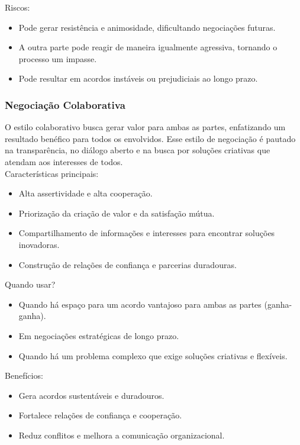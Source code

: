 \documentclass[article,12pt,oneside,a4paper]{article}
\begin{document}
Riscos:

\begin{itemize}
\item Pode gerar resistência e animosidade, dificultando negociações futuras.
\item A outra parte pode reagir de maneira igualmente agressiva, tornando o processo um impasse.
\item Pode resultar em acordos instáveis ou prejudiciais ao longo prazo.
\end{itemize}
\subsubsection{Negociação Colaborativa}
\label{sec:orgda140d4}

O estilo colaborativo busca gerar valor para ambas as partes, enfatizando um resultado benéfico para todos os envolvidos. Esse estilo de negociação é pautado na transparência, no diálogo aberto e na busca por soluções criativas que atendam aos interesses de todos. \\

Características principais:

\begin{itemize}
\item Alta assertividade e alta cooperação.
\item Priorização da criação de valor e da satisfação mútua.
\item Compartilhamento de informações e interesses para encontrar soluções inovadoras.
\item Construção de relações de confiança e parcerias duradouras.
\end{itemize}

Quando usar?

\begin{itemize}
\item Quando há espaço para um acordo vantajoso para ambas as partes (ganha-ganha).
\item Em negociações estratégicas de longo prazo.
\item Quando há um problema complexo que exige soluções criativas e flexíveis.
\end{itemize}

Benefícios:

\begin{itemize}
\item Gera acordos sustentáveis e duradouros.
\item Fortalece relações de confiança e cooperação.
\item Reduz conflitos e melhora a comunicação organizacional.
\end{itemize}
\end{document}

